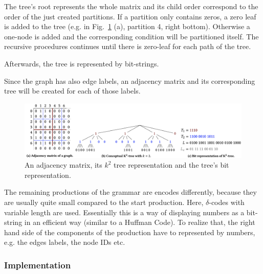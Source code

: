 The tree's root represents the whole matrix and its child order correspond to the order of the just created partitions. If a partition only contains zeros, a zero leaf is added to the tree (e.g. in Fig.~\ref{fig:encoding} (a), partition 4, right bottom). Otherwise a one-node is added and the corresponding condition will be partitioned itself. The recursive procedures continues until there is zero-leaf for each path of the tree.

Afterwards, the tree is represented by bit-strings.

Since the graph has also edge labels, an adjacency matrix and its corresponding tree will be created for each of those labels.

\begin{figure}
	\centering
	\includegraphics[width=1\linewidth]{figures/relatedwork/encoding}
	\caption{An adjacency matrix, its $k^2$ tree representation and the tree's bit representation.}
	\label{fig:encoding}
\end{figure}

The remaining productions of the grammar are encodes differently, because they are usually quite small compared to the start production. Here, $\delta $-codes with variable length are used. Essentially this is a way of displaying numbers as a bit-string in an efficient way (similar to a Huffman Code). To realize that, the right hand side of the components of the production have to represented by numbers, e.g. the edges labels, the node IDs etc.~\cite{maneth}


\subsubsection{Implementation}\label{sec:relatedworkGRPImpl}

















